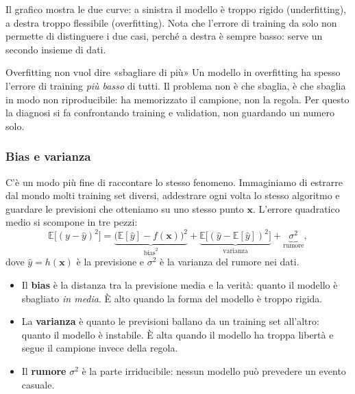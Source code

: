\documentclass[12pt]{extarticle}
\begin{document}
\noindent Il grafico mostra le due curve: a sinistra il modello è troppo rigido (underfitting), a destra troppo flessibile (overfitting). Nota che l'errore di training da solo non permette di distinguere i due casi, perché a destra è sempre basso: serve un secondo insieme di dati.

\begin{attenzionebox}{Overfitting non vuol dire «sbagliare di più»}
Un modello in overfitting ha spesso l'errore di training \emph{più basso} di tutti. Il problema non è che sbaglia, è che sbaglia in modo non riproducibile: ha memorizzato il campione, non la regola. Per questo la diagnosi si fa confrontando training e validation, non guardando un numero solo.
\end{attenzionebox}

\subsubsection{Bias e varianza}

\noindent C'è un modo più fine di raccontare lo stesso fenomeno. Immaginiamo di estrarre dal mondo molti training set diversi, addestrare ogni volta lo stesso algoritmo e guardare le previsioni che otteniamo su uno stesso punto $\mathbf{x}$. L'errore quadratico medio si scompone in tre pezzi:
\[
\mathbb{E}\bigl[(y - \hat{y})^2\bigr]
= \underbrace{\bigl(\mathbb{E}[\hat{y}] - f(\mathbf{x})\bigr)^2}_{\text{bias}^2}
+ \underbrace{\mathbb{E}\bigl[(\hat{y}-\mathbb{E}[\hat{y}])^2\bigr]}_{\text{varianza}}
+ \underbrace{\sigma^2}_{\text{rumore}},
\]
dove $\hat{y} = h(\mathbf{x})$ è la previsione e $\sigma^2$ è la varianza del rumore nei dati.

\begin{itemize}
    \item Il \textbf{bias} è la distanza tra la previsione media e la verità: quanto il modello è sbagliato \emph{in media}. È alto quando la forma del modello è troppo rigida.
    \item La \textbf{varianza} è quanto le previsioni ballano da un training set all'altro: quanto il modello è instabile. È alta quando il modello ha troppa libertà e segue il campione invece della regola.
    \item Il \textbf{rumore} $\sigma^2$ è la parte irriducibile: nessun modello può prevedere un evento casuale.
\end{itemize}
\end{document}
